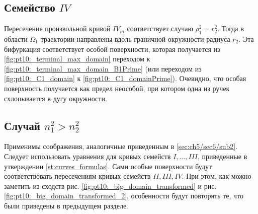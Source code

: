  \subsection{Семейство $IV$}
Пересечение произвольной кривой $IV_m$ соответствует случаю $\rho_1^2 = r_2^2$. Тогда в области $\Omega_1$ траектории направлены вдоль граничной окружности радиуса $r_2$. Эта бифуркация соответствует особой поверхности, которая получается из \ref{fig:pt10:_terminal_max_domain} переходом к \ref{fig:pt10:_terminal_max_domain_B1Prime} (или переходом из \ref{fig:pt10:_C1_domain} к \ref{fig:pt10:_C1_domainPrime}). Очевидно, что особая поверхность получается как предел неособой, при котором одна из ручек схлопывается в дугу окружности.


\subsection{Случай $n_1^2 > n_2^2$}
Применимы соображения, аналогичные приведенным в \ref{sec:ch5/sec6/sub2}. Следует использовать уравнения для кривых семейств $I, \ldots, III$, приведенные в утверждении \ref{st:curves_formulas}. Сами особые поверхности будут соответствовать пересечениям кривых семейств $II, III, IV$. При этом, как можно заметить из сходств рис. \ref{fig:pt10:_big_domain_transformed} и  рис. \ref{fig:pt10:_big_domain_transformed_2}, особенности будут повторять те, что были  приведены в предыдущем разделе.
